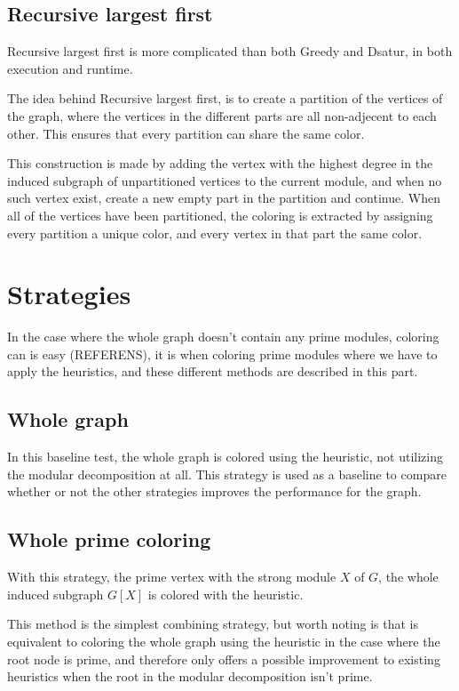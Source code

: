 \documentclass{amsart}
\begin{document}
\subsection{Recursive largest first}

Recursive largest first is more complicated than both Greedy and Dsatur, in both
execution and runtime. 

The idea behind Recursive largest first, is to create a partition of the
vertices of the graph, where the vertices in the different parts are all
non-adjecent to each other. This ensures that every partition can share the
same color. 

This construction is made by adding the vertex with the highest degree in the
induced subgraph of unpartitioned vertices to the current module, and when no
such vertex exist, create a new empty part in the partition and continue. When
all of the vertices have been partitioned, the coloring is extracted by
assigning every partition a unique color, and every vertex in that part the same
color.




\section{Strategies}
\label{sec:Strategies}
In the case where the whole graph doesn't contain any prime modules, coloring
can is easy (REFERENS), it is when coloring prime modules where we have to apply
the heuristics, and these different methods are described in this part.

\subsection{Whole graph}

In this baseline test, the whole graph is colored using the heuristic, not
utilizing the modular decomposition at all. This strategy is used as a baseline
to compare whether or not the other strategies improves the performance for the
graph.

\subsection{Whole prime coloring}

With this strategy, the prime vertex with the strong module $X$ of $G$, the
whole induced subgraph $G[X]$ is colored with the heuristic.

This method is the simplest combining strategy, but worth noting is that is
equivalent to coloring the whole graph using the heuristic in the case where the
root node is prime, and therefore only offers a possible improvement to existing
heuristics when the root in the modular decomposition isn't prime.
\end{document}
